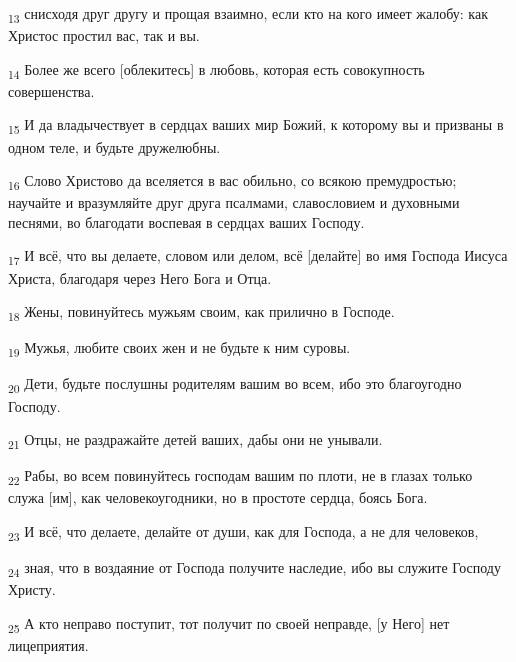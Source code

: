 \begin{tcolorbox}
\textsubscript{13} снисходя друг другу и прощая взаимно, если кто на кого имеет жалобу: как Христос простил вас, так и вы.
\end{tcolorbox}
\begin{tcolorbox}
\textsubscript{14} Более же всего [облекитесь] в любовь, которая есть совокупность совершенства.
\end{tcolorbox}
\begin{tcolorbox}
\textsubscript{15} И да владычествует в сердцах ваших мир Божий, к которому вы и призваны в одном теле, и будьте дружелюбны.
\end{tcolorbox}
\begin{tcolorbox}
\textsubscript{16} Слово Христово да вселяется в вас обильно, со всякою премудростью; научайте и вразумляйте друг друга псалмами, славословием и духовными песнями, во благодати воспевая в сердцах ваших Господу.
\end{tcolorbox}
\begin{tcolorbox}
\textsubscript{17} И всё, что вы делаете, словом или делом, всё [делайте] во имя Господа Иисуса Христа, благодаря через Него Бога и Отца.
\end{tcolorbox}
\begin{tcolorbox}
\textsubscript{18} Жены, повинуйтесь мужьям своим, как прилично в Господе.
\end{tcolorbox}
\begin{tcolorbox}
\textsubscript{19} Мужья, любите своих жен и не будьте к ним суровы.
\end{tcolorbox}
\begin{tcolorbox}
\textsubscript{20} Дети, будьте послушны родителям вашим во всем, ибо это благоугодно Господу.
\end{tcolorbox}
\begin{tcolorbox}
\textsubscript{21} Отцы, не раздражайте детей ваших, дабы они не унывали.
\end{tcolorbox}
\begin{tcolorbox}
\textsubscript{22} Рабы, во всем повинуйтесь господам вашим по плоти, не в глазах только служа [им], как человекоугодники, но в простоте сердца, боясь Бога.
\end{tcolorbox}
\begin{tcolorbox}
\textsubscript{23} И всё, что делаете, делайте от души, как для Господа, а не для человеков,
\end{tcolorbox}
\begin{tcolorbox}
\textsubscript{24} зная, что в воздаяние от Господа получите наследие, ибо вы служите Господу Христу.
\end{tcolorbox}
\begin{tcolorbox}
\textsubscript{25} А кто неправо поступит, тот получит по своей неправде, [у Него] нет лицеприятия.
\end{tcolorbox}
